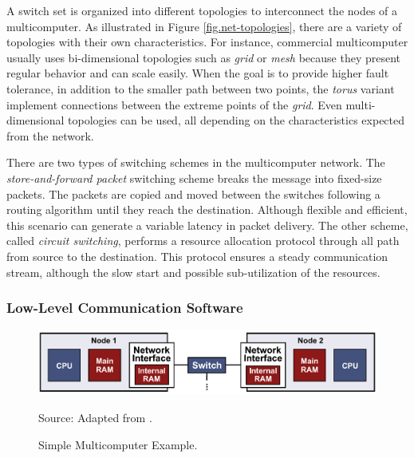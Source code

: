 				A switch set is organized into different topologies to interconnect
				the nodes of a multicomputer.
				As illustrated in Figure \ref{fig.net-topologies}, there are a
				variety of topologies with their own characteristics.
				For instance, commercial multicomputer usually uses bi-dimensional
				topologies such as \textit{grid} or \textit{mesh} because they present
				regular behavior and can scale easily.
				When the goal is to provide higher fault tolerance, in addition to the
				smaller path between two points, the \textit{torus} variant implement
				connections between the extreme points of the \textit{grid}.
				Even multi-dimensional topologies can be used, all depending on the
				characteristics expected from the network.

				There are two types of switching schemes in the multicomputer network.
				The \textit{store-and-forward packet} switching scheme breaks the message
				into fixed-size packets.
				The packets are copied and moved between the switches following a
				routing algorithm until they reach the destination.
				Although flexible and efficient, this scenario can generate a variable
				latency in packet delivery.
				The other scheme, called \textit{circuit switching}, performs a resource
				allocation protocol through all path from source to the destination.
				This protocol ensures a steady communication stream, although the
				slow start and possible sub-utilization of the resources.

			\subsubsection{Low-Level Communication Software}
			\label{sec.multicomputers-low-sw}

				\begin{figure}[t]
					\centering
					\caption{Simple Multicomputer Example.}%

					\includegraphics[width=.9\textwidth]{images/multicomputer.pdf}

					Source: Adapted from \cite{tanenbaum:4ed}.

					\label{fig.multicomputer}
				\end{figure}

